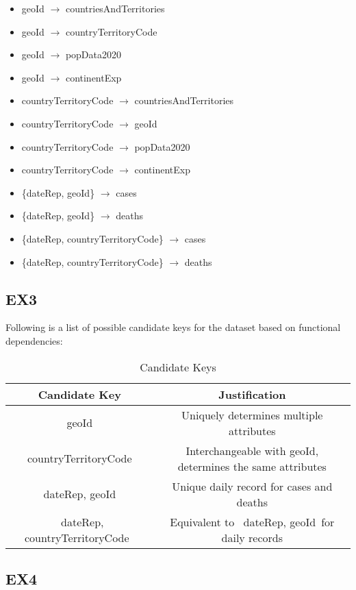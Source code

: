 \documentclass[10pt]{article}
\begin{document}
\begin{itemize}
\newpage
    \item geoId $\rightarrow$ countriesAndTerritories
    \item geoId $\rightarrow$ countryTerritoryCode
    \item geoId $\rightarrow$ popData2020
    \item geoId $\rightarrow$ continentExp
    \item countryTerritoryCode $\rightarrow$ countriesAndTerritories
    \item countryTerritoryCode $\rightarrow$ geoId
    \item countryTerritoryCode $\rightarrow$ popData2020
    \item countryTerritoryCode $\rightarrow$ continentExp
    \item \{dateRep, geoId\} $\rightarrow$ cases
    \item \{dateRep, geoId\} $\rightarrow$ deaths
    \item \{dateRep, countryTerritoryCode\} $\rightarrow$ cases
    \item \{dateRep, countryTerritoryCode\} $\rightarrow$ deaths
\end{itemize}




\subsection{EX3}
Following is a list of possible candidate keys for the dataset based on functional dependencies:

\begin{table}[h!]
\caption{ Candidate Keys}
\centering
\begin{tabular}{|c|c|}
\hline
\textbf{Candidate Key} & \textbf{Justification} \\
\hline
geoId & Uniquely determines multiple attributes \\ 
\hline
countryTerritoryCode & Interchangeable with geoId, determines the same attributes \\ 
\hline
\ dateRep, geoId\ & Unique daily record for cases and deaths \\
\hline
\ dateRep, countryTerritoryCode\ & Equivalent to \ dateRep, geoId\ for daily records \\
\hline
\end{tabular}
\label{tab:candidate_keys}
\end{table}


\subsection{EX4}
\end{document}
